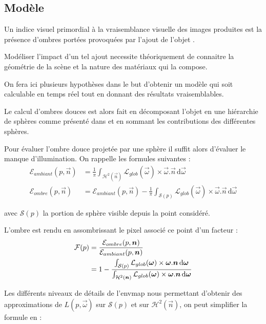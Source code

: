 \documentclass[10pt,a4paper,twoside, twocolumn]{report}
\begin{document}
\subsection{Modèle}

Un indice visuel primordial à la vraisemblance visuelle des images produites est la présence d’ombres portées provoquées par l’ajout de l’objet .

Modéliser l’impact d’un tel ajout necessite théoriquement de connaitre la géométrie de la scène et la nature des matériaux qui la compose.

On fera ici plusieurs hypothèses dans le but d’obtenir un modèle qui soit calculable en temps réel tout en donnant des résultats vraisemblables.

Le calcul d’ombres douces est alors fait en décomposant l’objet en une hiérarchie de sphères comme présenté dans\cite{Iwanicki} et en sommant les contributions des différentes sphères.

Pour évaluer l’ombre douce projetée par une sphère il suffit alors d’évaluer le manque d’illumination.
On rappelle les formules suivantes :
\begin{align*}
	\mathcal E_{ambiant}(p, \vec n)	&=	\frac{1}{\pi}\int_{\mathcal{H}^2(\vec{n})}\mathcal L_{glob}(\vec\omega)\times\vec\omega.\vec n\, \mathrm d\vec\omega \\
	\mathcal E_{ombre}(p, \vec n)		&=	\mathcal E_{ambiant}(p, \vec n) - \frac{1}{\pi}\int_{\mathcal{S}(p)}\mathcal L_{glob}(\vec\omega)\times\vec\omega.\vec n\, \mathrm d\vec\omega
\end{align*}

avec $\mathcal S(p)$ la portion de sphère visible depuis la point considéré.

L’ombre est rendu en assombrissant le pixel associé ce point d’un facteur :
\begin{align}
	\mathcal F(p)	&=	\frac{\mathcal E_{ombre}(p, \vec n)}{\mathcal E_{ambiant}(p, \vec n)}	\notag \\
								&=	1 - \frac{\int_{\mathcal{S}(p)}\mathcal L_{glob}(\vec\omega)\times\vec\omega.\vec n\, \mathrm d\vec\omega}{\int_{\mathcal{H}^2(\vec{n})}\mathcal L_{glob}(\vec\omega)\times\vec\omega.\vec n\, \mathrm d\vec\omega}	
\end{align}


Les différents niveaux de détails de l’envmap nous permettant d’obtenir des approximations de $L(p,\vec\omega)$ sur $\mathcal S(p)$ et sur $\mathcal{H}^2(\vec{n})$, on peut simplifier la formule en :
\end{document}
